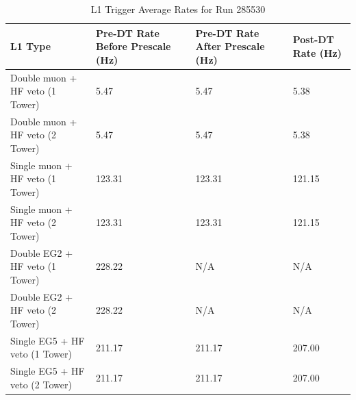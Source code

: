 \begin{table}[h!]
\centering
\caption{L1 Trigger Average Rates for Run 285530}
\label{my-label}
\begin{tabular}{@{}l|p{1.6cm}|p{1.6cm}|p{1.6cm}|}
\toprule
L1 Type                           & Pre-DT Rate Before Prescale (Hz) & Pre-DT Rate After Prescale (Hz) & Post-DT Rate (Hz) \\ \midrule
Double muon + HF veto (1 Tower) & 5.47             & 5.47                 & 5.38            \\
Double muon + HF veto (2 Tower) & 5.47             & 5.47                 & 5.38            \\
Single muon + HF veto (1 Tower) & 123.31	       & 123.31               & 121.15          \\
Single muon + HF veto (2 Tower) & 123.31           & 123.31               & 121.15             \\
Double EG2 + HF veto (1 Tower)  & 228.22           & N/A                  & N/A            \\
Double EG2 + HF veto (2 Tower)  & 228.22           & N/A                  & N/A            \\
Single EG5 + HF veto (1 Tower)  & 211.17           & 211.17                & 207.00	              \\ 
Single EG5 + HF veto (2 Tower)  & 211.17           & 211.17                & 207.00	              \\ 
\bottomrule
\end{tabular}
\end{table}

